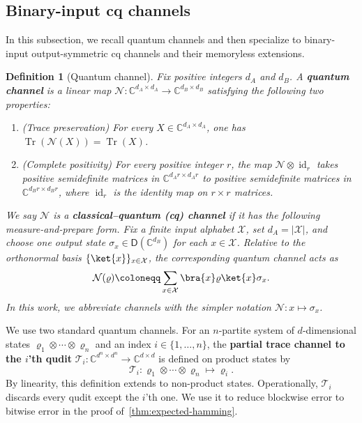 \documentclass[11pt]{article}
\newtheorem{definition}{Definition}[section]
\theoremstyle{remark}
\newcommand{\cX}{\mathcal{X}}
\newcommand{\T}{\mathcal{T}}
\newcommand{\C}{\mathbb{C}}
\newcommand{\Tr}{\operatorname{Tr}}
\newcommand{\Dens}{\mathsf{D}}
\newcommand{\abs}[1]{\left|#1\right|}
\newcommand{\N}{\mathcal{N}}
\begin{document}
\subsection{Binary-input cq channels}
\label{subsec:binary-input-cq-channels}

In this subsection, we recall quantum channels and then specialize to binary-input output-symmetric cq channels and their memoryless extensions.

\begin{definition}[Quantum channel]
\label{def:quantum-channel}
Fix positive integers $d_A$ and $d_B$. A \textbf{quantum channel} is a linear map $\N : \C^{d_A \times d_A} \to \C^{d_B \times d_B}$ satisfying the following two properties:
\begin{enumerate}
\item \emph{(Trace preservation)} For every $X \in \C^{d_A \times d_A}$, one has $\Tr(\N(X)) = \Tr(X)$.
\item \emph{(Complete positivity)} For every positive integer $r$, the map $\N \otimes \operatorname{id}_r$ takes positive semidefinite matrices in $\C^{d_A r \times d_A r}$ to positive semidefinite matrices in $\C^{d_B r \times d_B r}$, where $\operatorname{id}_r$ is the identity map on $r \times r$ matrices.
\end{enumerate}

We say $\N$ is a \textbf{classical--quantum (cq) channel} if it has the following measure-and-prepare form. Fix a finite input alphabet $\cX$, set $d_A = \abs{\cX}$, and choose one output state $\sigma_x \in \Dens(\C^{d_B})$ for each $x \in \cX$. Relative to the orthonormal basis $\{\ket{x}\}_{x \in \cX}$, the corresponding quantum channel acts as
\begin{equation*}
\N(\varrho) \coloneqq \sum_{x \in \cX}{\bra{x} \varrho \ket{x} \sigma_x}.
\end{equation*}
In this work, we abbreviate channels with the simpler notation $\N : x \mapsto \sigma_x$.
\end{definition}

We use two standard quantum channels. For an $n$-partite system of $d$-dimensional states $\varrho_1 \otimes \cdots \otimes \varrho_n$ and an index $i \in \{1, \ldots , n\}$, the \textbf{partial trace channel to the $i$'th qudit} $\T_i : \C^{d^n \times d^n} \to \C^{d \times d}$ is defined on product states by
\begin{equation}
\label{eq:partial-trace-product}
\T_i : \varrho_1 \otimes \cdots \otimes \varrho_n \longmapsto \varrho_i.
\end{equation}
By linearity, this definition extends to non-product states. Operationally, $\T_i$ discards every qudit except the $i$'th one. We use it to reduce blockwise error to bitwise error in the proof of~\cref{thm:expected-hamming}.
\end{document}

